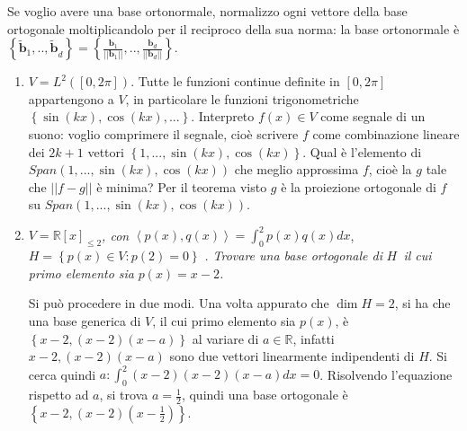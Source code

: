\documentclass{article}
\begin{document}
Se voglio avere una base ortonormale, normalizzo ogni vettore della base
ortogonale moltiplicandolo per il reciproco della sua norma: la base
ortonormale \`{e} $\left\{ \mathbf{\tilde{b}}_{1}\mathbf{,..,\tilde{b}}%
_{d}\right\} =\left\{ \frac{\mathbf{b}_{1}}{\left\vert \left\vert \mathbf{b}%
_{1}\right\vert \right\vert }\mathbf{,..,}\frac{\mathbf{b}_{d}}{\left\vert
\left\vert \mathbf{b}_{d}\right\vert \right\vert }\right\} $.

\begin{enumerate}
\item $V=L^{2}\left( \left[ 0,2\pi \right] \right) $. Tutte le funzioni
continue definite in $\left[ 0,2\pi \right] $ appartengono a $V$, in
particolare le funzioni trigonometriche $\left\{ \sin \left( kx\right) ,\cos
\left( kx\right) ,...\right\} $. Interpreto $f\left( x\right) \in V$ come
segnale di un suono: voglio comprimere il segnale, cio\`{e} scrivere $f$
come combinazione lineare dei $2k+1$ vettori $\left\{ 1,...,\sin \left(
kx\right) ,\cos \left( kx\right) \right\} $. Qual \`{e} l'elemento di $%
Span\left( 1,...,\sin \left( kx\right) ,\cos \left( kx\right) \right) $ che
meglio approssima $f$, cio\`{e} la $g$ tale che $\left\vert \left\vert
f-g\right\vert \right\vert $ \`{e} minima? Per il teorema visto $g$ \`{e} la
proiezione ortogonale di $f$ su $Span\left( 1,...,\sin \left( kx\right)
,\cos \left( kx\right) \right) $.

\item $V=%
\mathbb{R}
\left[ x\right] _{\leq 2}$\textit{, con }$\left\langle p\left( x\right)
,q\left( x\right) \right\rangle =\int_{0}^{2}p\left( x\right) q\left(
x\right) dx$, $H=\left\{ p\left( x\right) \in V:p\left( 2\right) =0\right\} $%
\textit{. Trovare una base ortogonale di }$H$\textit{\ il cui primo elemento
sia }$p\left( x\right) =x-2$\textit{.}

Si pu\`{o} procedere in due modi. Una volta appurato che $\dim H=2$, si ha
che una base generica di $V$, il cui primo elemento sia $p\left( x\right) $, 
\`{e} $\left\{ x-2,\left( x-2\right) \left( x-a\right) \right\} $ al variare
di $a\in 
\mathbb{R}
$, infatti $x-2,\left( x-2\right) \left( x-a\right) $ sono due vettori
linearmente indipendenti di $H$. Si cerca quindi $a:\int_{0}^{2}\left(
x-2\right) \left( x-2\right) \left( x-a\right) dx=0$. Risolvendo l'equazione
rispetto ad $a$, si trova $a=\frac{1}{2}$, quindi una base ortogonale \`{e} $%
\left\{ x-2,\left( x-2\right) \left( x-\frac{1}{2}\right) \right\} $.


\end{enumerate}
\end{document}
